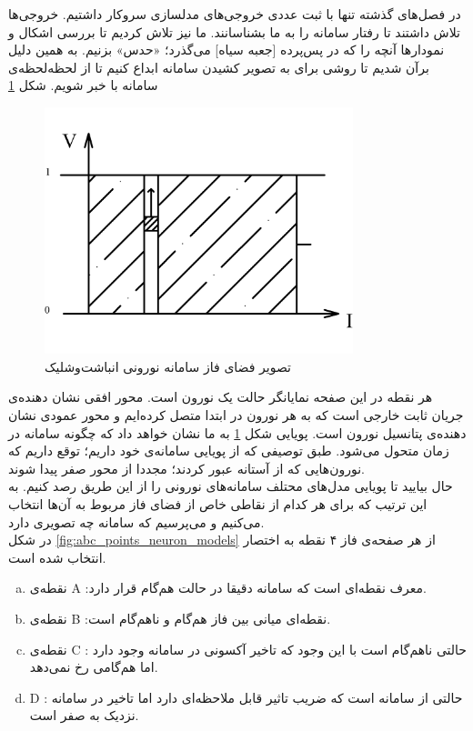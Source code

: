 در فصل‌های گذشته تنها با ثبت عددی خروجی‌های مدلسازی سروکار داشتیم. خروجی‌ها تلاش داشتند تا رفتار سامانه را به ما بشناسانند. ما نیز تلاش کردیم تا بررسی اشکال و نمودارها آنچه را که در پس‌پرده [جعبه سیاه] می‌گذرد؛ «حدس» بزنیم. به همین دلیل برآن شدیم تا روشی برای به تصویر کشیدن سامانه ابداع کنیم تا از لحظه‌لحظه‌ی سامانه با خبر شویم. شکل \ref{fig:if_animation_plot}

\begin{figure}[h]
	\centering
	\includegraphics[width =0.8\textwidth]{../papers_studies/figs/IF/IF_phase_space-Model.png}
	\caption{تصویر فضای فاز سامانه نورونی انباشت‌وشلیک}
	\label{fig:if_animation_plot}
\end{figure}

هر نقطه در این صفحه نمایانگر حالت یک نورون است. محور افقی نشان دهنده‌ی جریان ثابت خارجی است که به هر نورون در ابتدا متصل کرده‌ایم و محور عمودی نشان دهنده‌ی پتانسیل نورون است. پویایی شکل \ref{fig:if_animation_plot} به ما نشان خواهد داد که چگونه سامانه در زمان متحول می‌شود. طبق توصیفی که از پویایی سامانه‌ی خود داریم؛ توقع داریم که نورون‌هایی که از آستانه عبور کردند؛ مجددا از محور صفر پیدا شوند.\\

حال بیایید تا پویایی مدل‌های محتلف سامانه‌های نورونی را از این طریق رصد کنیم. به این ترتیب که برای هر کدام از نقاطی خاص از فضای فاز مربوط به آن‌ها انتخاب می‌کنیم و می‌پرسیم که سامانه چه تصویری دارد.\\
در شکل‌ 
\ref{fig:abc_points_neuron_models}
از هر صفحه‌ی فاز ۴ نقطه به اختصار انتخاب شده است.
\begin{enumerate}[a.]
	\item 
	نقطه‌ی 
	A
	:معرف نقطه‌ای است که سامانه دقیقا در حالت هم‌گام قرار دارد.
	\item 
	نقطه‌ی
	B
	:نقطه‌ای میانی بین فاز هم‌گام و ناهم‌گام است.
	\item 
	نقطه‌ی
	C
	: حالتی ناهم‌گام است با این وجود که تاخیر آکسونی در سامانه وجود دارد اما هم‌گامی رخ نمی‌دهد.
	\item 
	D
	: حالتی از سامانه است که ضریب تاثیر قابل ملاحظه‌ای دارد اما تاخیر در سامانه نزدیک به صفر است.
\end{enumerate}

